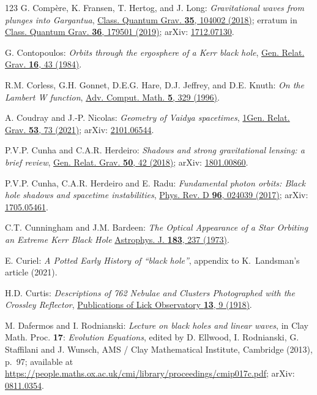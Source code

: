 \begin{thebibliography}{123}
G. Compère, K. Fransen, T. Hertog, and J. Long:
{\em Gravitational waves from plunges into Gargantua},
\href{https://doi.org/10.1088/1361-6382/aab99e}{Class. Quantum Grav. {\bf 35}, 104002 (2018)};
erratum in \href{https://doi.org/10.1088/1361-6382/ab3629}{Class. Quantum Grav. {\bf 36}, 179501 (2019)};
arXiv: \href{https://arxiv.org/abs/1712.07130}{1712.07130}.

G. Contopoulos:
{\em Orbits through the ergosphere of a Kerr black hole},
\href{https://doi.org/10.1007/BF00764017}{Gen. Relat. Grav. {\bf 16}, 43 (1984)}.

R.M. Corless, G.H. Gonnet, D.E.G. Hare, D.J. Jeffrey, and D.E. Knuth:
{\em On the Lambert W function},
\href{https://doi.org/10.1007/BF02124750}{Adv. Comput. Math. {\bf 5}, 329 (1996)}.

A. Coudray and J.-P. Nicolas:
{\em Geometry of Vaidya spacetimes},
\href{https://doi.org/10.1007/s10714-021-02839-7}{1Gen. Relat. Grav. {\bf 53}, 73 (2021)};
arXiv: \href{https://arxiv.org/abs/2101.06544}{2101.06544}.

P.V.P. Cunha and C.A.R. Herdeiro:
{\em Shadows and strong gravitational lensing: a brief review},
\href{https://doi.org/10.1007/s10714-018-2361-9}{Gen. Relat. Grav. {\bf 50}, 42 (2018)};
arXiv: \href{https://arxiv.org/abs/1801.00860}{1801.00860}.

P.V.P. Cunha, C.A.R. Herdeiro and E. Radu:
{\em Fundamental photon orbits: Black hole shadows and spacetime instabilities},
\href{https://doi.org/10.1103/PhysRevD.96.024039}{Phys. Rev. D {\bf 96}, 024039 (2017)};
arXiv: \href{https://arxiv.org/abs/1705.05461}{1705.05461}.

C.T. Cunningham and J.M. Bardeen:
{\em The Optical Appearance of a Star Orbiting an Extreme Kerr Black Hole}
\href{https://doi.org/10.1086/152223}{Astrophys. J. {\bf 183}, 237 (1973)}.

E. Curiel:
{\em A Potted Early History of ``black hole''},
appendix to K.~Landsman's article \cite{Lands21} (2021).

H.D. Curtis:
{\em Descriptions of 762 Nebulae and Clusters Photographed with the Crossley Reflector},
\href{https://ui.adsabs.harvard.edu/abs/1918PLicO..13....9C}{Publications of Lick Observatory {\bf 13}, 9 (1918)}.

M. Dafermos and I. Rodnianski: {\em Lecture on black holes and linear waves},
in  Clay Math. Proc. {\bf 17}: {\em Evolution Equations}, edited by
D. Ellwood, I. Rodnianski, G. Staffilani and J. Wunsch, AMS / Clay Mathematical Institute,
Cambridge (2013), p.~97; available at
\url{https://people.maths.ox.ac.uk/cmi/library/proceedings/cmip017c.pdf};
arXiv: \href{https://arxiv.org/abs/0811.0354}{0811.0354}.


\end{thebibliography}
